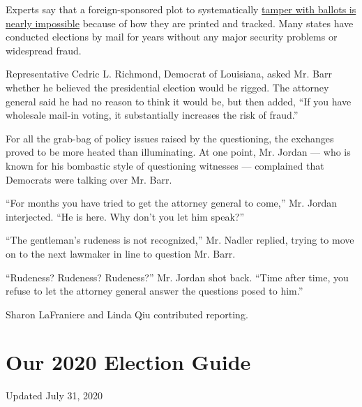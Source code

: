 Experts say that a foreign-sponsored plot to systematically
\href{https://www.nytimes.com/article/mail-in-vote-fraud-ballot.html}{tamper
with ballots is nearly impossible} because of how they are printed and
tracked. Many states have conducted elections by mail for years without
any major security problems or widespread fraud.

Representative Cedric L. Richmond, Democrat of Louisiana, asked Mr. Barr
whether he believed the presidential election would be rigged. The
attorney general said he had no reason to think it would be, but then
added, ``If you have wholesale mail-in voting, it substantially
increases the risk of fraud.''

For all the grab-bag of policy issues raised by the questioning, the
exchanges proved to be more heated than illuminating. At one point, Mr.
Jordan --- who is known for his bombastic style of questioning witnesses
--- complained that Democrats were talking over Mr. Barr.

``For months you have tried to get the attorney general to come,'' Mr.
Jordan interjected. ``He is here. Why don't you let him speak?''

``The gentleman's rudeness is not recognized,'' Mr. Nadler replied,
trying to move on to the next lawmaker in line to question Mr. Barr.

``Rudeness? Rudeness? Rudeness?'' Mr. Jordan shot back. ``Time after
time, you refuse to let the attorney general answer the questions posed
to him.''

Sharon LaFraniere and Linda Qiu contributed reporting.

\hypertarget{our-2020-election-guide}{%
\section{Our 2020 Election Guide}\label{our-2020-election-guide}}

Updated July 31, 2020

